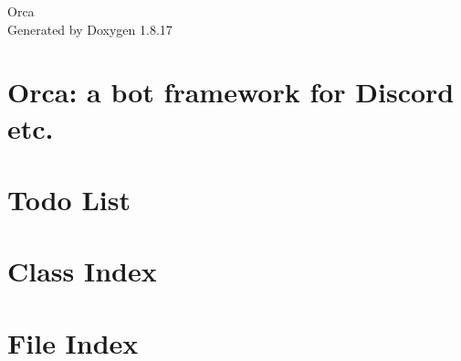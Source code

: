 \let\mypdfximage\pdfximage\def\pdfximage{\immediate\mypdfximage}\documentclass[twoside]{book}
\newcommand{\+}{\discretionary{\mbox{\scriptsize$\hookleftarrow$}}{}{}}
\newcommand{\clearemptydoublepage}{%
  \newpage{\pagestyle{empty}\cleardoublepage}%
}
\begin{document}
\hypersetup{pageanchor=false,
             bookmarksnumbered=true,
             pdfencoding=unicode
            }
\begin{titlepage}
\vspace*{7cm}
\begin{center}%
{\Large Orca }\\
\vspace*{1cm}
{\large Generated by Doxygen 1.8.17}\\
\end{center}
\end{titlepage}
\clearemptydoublepage
{}
\tableofcontents
\clearemptydoublepage
{}
\hypersetup{pageanchor=true}

\chapter{Orca\+: a bot framework for Discord etc.}
\label{index}\hypertarget{index}{}
\chapter{Todo List}
\label{todo}

\chapter{Class Index}

\chapter{File Index}

\end{document}
